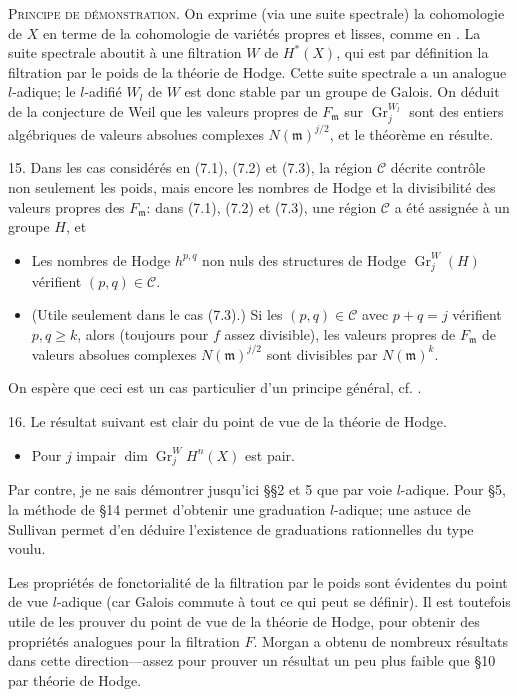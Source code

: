 \documentclass{amsart}
\theoremstyle{plain}
\theoremstyle{definition}
\theoremstyle{remark}
\DeclareMathOperator{\Gr}{Gr}
\begin{document}
\textsc{Principe de d\'emonstration.} On exprime (via une suite spectrale) la cohomologie de $X$ en terme de la cohomologie de vari\'et\'es propres et lisses, comme en \cite{D1}. La suite spectrale aboutit \`a une filtration $W$ de $H^*(X)$, qui est par d\'efinition la filtration par le poids de la th\'eorie de Hodge. Cette suite spectrale a un analogue $l$-adique; le $l$-adifi\'e $W_l$ de $W$ est donc stable par un groupe de Galois. On d\'eduit de la conjecture de Weil que les valeurs propres de $F_{\mathfrak{m}}$ sur $\Gr_j^{W_l}$ sont des entiers alg\'ebriques de valeurs absolues complexes $N(\mathfrak{m})^{j/2}$, et le th\'eor\`eme en r\'esulte.

15. Dans les cas consid\'er\'es en (7.1), (7.2) et (7.3), la r\'egion $\mathscr{C}$ d\'ecrite contr\^ole non seulement les poids, mais encore les nombres de Hodge et la divisibilit\'e des valeurs propres des $F_{\mathfrak{m}}$: dans (7.1), (7.2) et (7.3), une r\'egion $\mathscr{C}$ a \'et\'e assign\'ee \`a un groupe $H$, et
\begin{itemize}
\item[(a)] Les nombres de Hodge $h^{p,q}$ non nuls des structures de Hodge $\Gr_j^W(H)$ v\'erifient $(p,q) \in \mathscr{C}$.
\item[(b)] (Utile seulement dans le cas (7.3).) Si les $(p,q) \in \mathscr{C}$ avec $p + q = j$ v\'erifient $p, q \geq k$, alors (toujours pour $f$ assez divisible), les valeurs propres de $F_{\mathfrak{m}}$ de valeurs absolues complexes $N(\mathfrak{m})^{j/2}$ sont divisibles par $N(\mathfrak{m})^k$.
\end{itemize}
On esp\`ere que ceci est un cas particulier d'un principe g\'en\'eral, cf. \cite{M}.

16. Le r\'esultat suivant est clair du point de vue de la th\'eorie de Hodge.
\begin{itemize}
\item[(16.1)] Pour $j$ impair $\dim \Gr_j^W H^n(X)$ est pair.
\end{itemize}
Par contre, je ne sais d\'emontrer jusqu'ici \S\S 2 et 5 que par voie $l$-adique. Pour \S 5, la m\'ethode de \S 14 permet d'obtenir une graduation $l$-adique; une astuce de Sullivan permet d'en d\'eduire l'existence de graduations rationnelles du type voulu.

Les propri\'et\'es de fonctorialit\'e de la filtration par le poids sont \'evidentes du point de vue $l$-adique (car Galois commute \`a tout ce qui peut se d\'efinir). Il est toutefois utile de les prouver du point de vue de la th\'eorie de Hodge, pour obtenir des propri\'et\'es analogues pour la filtration $F$. Morgan a obtenu de nombreux r\'esultats dans cette direction---assez pour prouver un r\'esultat un peu plus faible que \S 10 par th\'eorie de Hodge.
\end{document}
